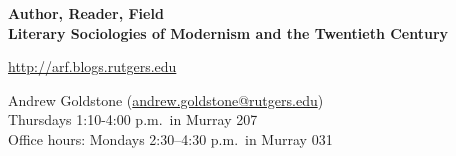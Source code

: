 \documentclass[12pt]{article}
\begin{document}
\textbf{\large
Author, Reader, Field \\
Literary Sociologies of Modernism and the Twentieth Century%
}

\url{http://arf.blogs.rutgers.edu}

Andrew Goldstone (\url{andrew.goldstone@rutgers.edu})  \\
Thursdays 1:10-4:00 p.m.\ in Murray 207  \\
Office hours: Mondays 2:30--4:30 p.m.\ in Murray 031 \\


\newpage



\newpage

\vfill
\footnotesize


\newpage

\nocite{*}
\printbibliography[notkeyword=supplemental,title=Readings]
\end{document}
